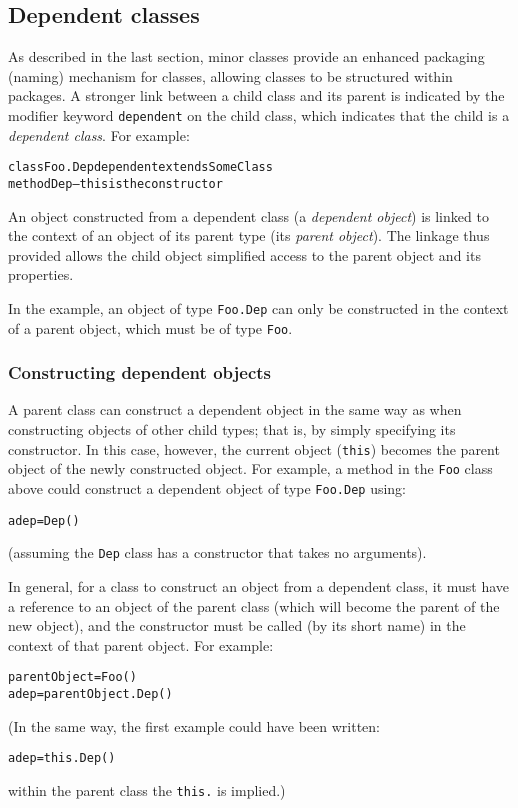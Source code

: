 \subsection{Dependent classes}\label{refsdepen}
\index{,}
\index{,}
\index{,}
 
As described in the last section, minor classes provide an enhanced
packaging (naming) mechanism for classes, allowing classes to be
structured within packages.  A stronger link between a child class and
its parent is indicated by the modifier keyword \texttt{dependent} on the
child class, which indicates that the child is a \emph{dependent class}.
For example:
\begin{alltt}
class Foo.Dep dependent extends SomeClass
  method Dep   -- this is the constructor
\end{alltt}
 
An object constructed from a dependent class (a \emph{dependent
object}) is linked to the context of an object of its parent
type (its \emph{parent object}).
The linkage thus provided allows the child object simplified access to
the parent object and its properties.
 
In the example, an object of type \texttt{Foo.Dep} can only be constructed
in the context of a parent object, which must be of type \texttt{Foo}.
\subsubsection{Constructing dependent objects}
 
A parent class can construct a dependent object in the same way as when
constructing objects of other child types; that is, by simply specifying
its constructor.  In this case, however, the current object
(\texttt{this}) becomes the parent object of the newly constructed object.
For example, a method in the \texttt{Foo} class above could construct a
dependent object of type \texttt{Foo.Dep} using:
\begin{alltt}
adep=Dep()
\end{alltt}
(assuming the \texttt{Dep} class has a constructor that takes no
arguments).
 
In general, for a class to construct an object from a dependent class,
it must have a reference to an object of the parent class (which will
become the parent of the new object), and the constructor must be called
(by its short name) in the context of that parent object.  For example:
\begin{alltt}
parentObject=Foo()
adep=parentObject.Dep()
\end{alltt}
(In the same way, the first example could have been written:
\begin{alltt}
adep=this.Dep()
\end{alltt}
within the parent class the \texttt{this.} is implied.)
 
